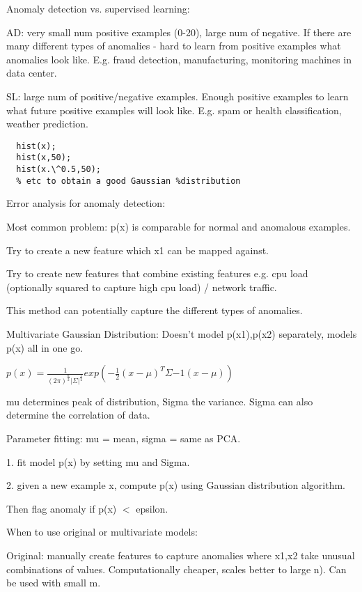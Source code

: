 \documentclass[12pt, a4paper]{article}
\begin{document}
{  Anomaly detection vs. supervised learning:

  AD: very small num positive examples (0-20), large num of negative. If there 
  are many different types of anomalies - hard to learn from positive examples 
  what anomalies look like. E.g. fraud detection, manufacturing, monitoring 
  machines in data center. 
  
  SL: large num of positive/negative examples. Enough positive examples to 
  learn what future positive examples will look like. E.g. spam or health
  classification, weather prediction.

  \begin{lstlisting}
  hist(x); 
  hist(x,50); 
  hist(x.\^0.5,50); 
  % etc to obtain a good Gaussian %distribution
  \end{lstlisting}

  Error analysis for anomaly detection:

  Most common problem: p(x) is comparable for normal and anomalous examples.
  
  Try to create a new feature which x1 can be mapped against. 

  Try to create new features that combine existing features e.g. cpu load
  (optionally squared to capture high cpu load) / network traffic.
  
  This method can potentially capture the different types of anomalies. 
  
  Multivariate Gaussian Distribution: Doesn't model p(x1),p(x2) separately,
  models p(x) all in one go. 

  $p(x) = \frac{1}{(2\pi)^{\frac{n}{2}}|\Sigma|^{\frac{1}{2}}} 
  exp(-\frac{1}{2}(x-\mu)^T\Sigma{-1}(x-\mu))$
  
  mu determines peak of distribution, Sigma the variance. Sigma can also
  determine the correlation of data.

  Parameter fitting: mu = mean, sigma = same as PCA. 

  1. fit model p(x) by setting mu and Sigma.

  2. given a new example x, compute p(x) using Gaussian distribution
  algorithm.

  Then flag anomaly if p(x) $<$ epsilon. 

  When to use original or multivariate models:

  Original: manually create features to capture anomalies where x1,x2 take
  unusual combinations of values. Computationally cheaper, scales better to
  large n). Can be used with small m. 

}
\end{document}
